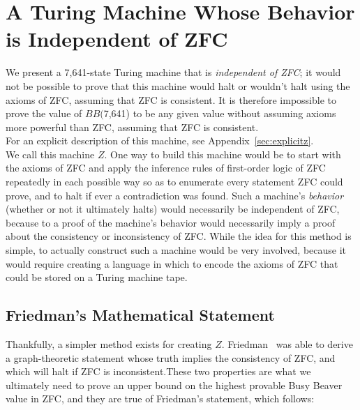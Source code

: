 \documentclass[11pt]{article}
\newcommand{\statenumstate}{7,641-state }
\newcommand{\bbstatenum}{$BB($7,641) }
\begin{document}
\section{A Turing Machine Whose Behavior is Independent of ZFC}

We present a \statenumstate Turing machine that is \emph{independent of ZFC}; it would not be possible to prove that this machine would halt or wouldn't halt using the axioms of ZFC, assuming that ZFC is consistent. It is therefore impossible to prove the value of \bbstatenum to be any given value without assuming axioms more powerful than ZFC, assuming that ZFC is consistent. \\

For an explicit description of this machine, see Appendix~\ref{sec:explicitz}. \\

We call this machine $Z$. One way to build this machine would be to start with the axioms of ZFC and apply the inference rules of first-order logic of ZFC repeatedly in each possible way so as to enumerate every statement ZFC could prove, and to halt if ever a contradiction was found. Such a machine's \emph{behavior} (whether or not it ultimately halts) would necessarily be independent of ZFC, because to a proof of the machine's behavior would necessarily imply a proof about the consistency or inconsistency of ZFC. While the idea for this method is simple, to actually construct such a machine would be very involved, because it would require creating a language in which to encode the axioms of ZFC that could be stored on a Turing machine tape. \\

\subsection{Friedman's Mathematical Statement}

Thankfully, a simpler method exists for creating $Z$. Friedman~\cite{friedman}
was able to derive a graph-theoretic statement whose truth implies the consistency of ZFC, and which will halt if ZFC is inconsistent.\footnotemark These two properties are what we ultimately need to prove an upper bound on the highest provable Busy Beaver value in ZFC, and they are true of Friedman's statement, which follows: \\
\end{document}
